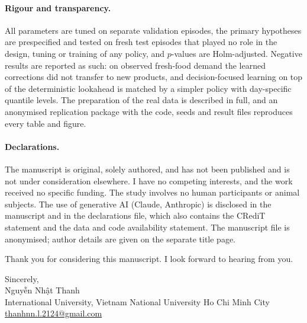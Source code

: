 \documentclass[11pt,a4paper]{article}
\begin{document}
\paragraph{Rigour and transparency.} All parameters are tuned on separate validation episodes, the primary hypotheses are prespecified and tested on fresh test episodes that played no role in the design, tuning or training of any policy, and $p$-values are Holm-adjusted. Negative results are reported as such: on observed fresh-food demand the learned corrections did not transfer to new products, and decision-focused learning on top of the deterministic lookahead is matched by a simpler policy with day-specific quantile levels. The preparation of the real data is described in full, and an anonymised replication package with the code, seeds and result files reproduces every table and figure.

\paragraph{Declarations.} The manuscript is original, solely authored, and has not been published and is not under consideration elsewhere. I have no competing interests, and the work received no specific funding. The study involves no human participants or animal subjects. The use of generative AI (Claude, Anthropic) is disclosed in the manuscript and in the declarations file, which also contains the CRediT statement and the data and code availability statement. The manuscript file is anonymised; author details are given on the separate title page.

\medskip
Thank you for considering this manuscript. I look forward to hearing from you.

\medskip
\noindent Sincerely,\\[0.3em]
Nguyễn Nhật Thanh\\
International University, Vietnam National University Ho Chi Minh City\\
\href{mailto:thanhnn.l.2124@gmail.com}{thanhnn.l.2124@gmail.com}



\end{document}
